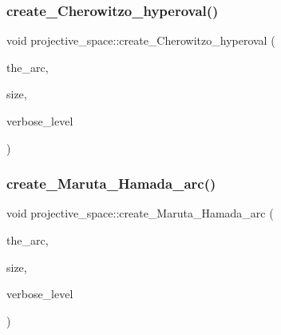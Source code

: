 \mbox{\label{classprojective__space_a6301b003d406b0917651ed0f27e9b17b}} 
\subsubsection{\texorpdfstring{create\+\_\+\+Cherowitzo\+\_\+hyperoval()}{create\_Cherowitzo\_hyperoval()}}
{\footnotesize\ttfamily void projective\+\_\+space\+::create\+\_\+\+Cherowitzo\+\_\+hyperoval (\begin{DoxyParamCaption}\item[{\mbox{\hyperlink{galois_8h_a09fddde158a3a20bd2dcadb609de11dc}{I\+NT}} $\ast$}]{the\+\_\+arc,  }\item[{\mbox{\hyperlink{galois_8h_a09fddde158a3a20bd2dcadb609de11dc}{I\+NT}} \&}]{size,  }\item[{\mbox{\hyperlink{galois_8h_a09fddde158a3a20bd2dcadb609de11dc}{I\+NT}}}]{verbose\+\_\+level }\end{DoxyParamCaption})}

\mbox{\label{classprojective__space_a0139fefceb87bdff7eca4947f6ded89b}} 
\subsubsection{\texorpdfstring{create\+\_\+\+Maruta\+\_\+\+Hamada\+\_\+arc()}{create\_Maruta\_Hamada\_arc()}}
{\footnotesize\ttfamily void projective\+\_\+space\+::create\+\_\+\+Maruta\+\_\+\+Hamada\+\_\+arc (\begin{DoxyParamCaption}\item[{\mbox{\hyperlink{galois_8h_a09fddde158a3a20bd2dcadb609de11dc}{I\+NT}} $\ast$}]{the\+\_\+arc,  }\item[{\mbox{\hyperlink{galois_8h_a09fddde158a3a20bd2dcadb609de11dc}{I\+NT}} \&}]{size,  }\item[{\mbox{\hyperlink{galois_8h_a09fddde158a3a20bd2dcadb609de11dc}{I\+NT}}}]{verbose\+\_\+level }\end{DoxyParamCaption})}


